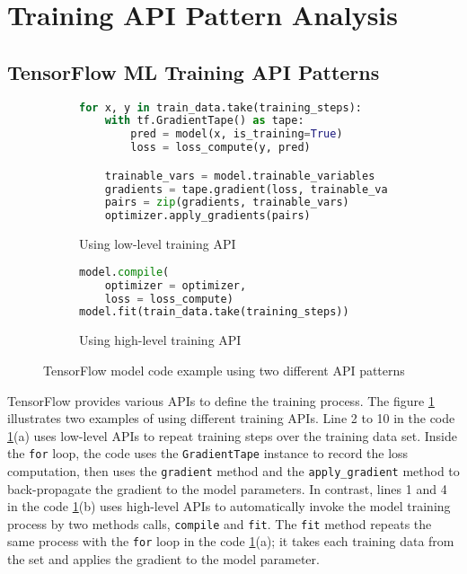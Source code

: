 \section{Training API Pattern Analysis}\label{sec:pattern}

\subsection{TensorFlow ML Training API Patterns}

\begin{figure}[ht!]
\centering
  \begin{subfigure}[b]{0.4\textwidth}
    \begin{lstlisting}[language=Python]
for x, y in train_data.take(training_steps):
    with tf.GradientTape() as tape:
        pred = model(x, is_training=True)
        loss = loss_compute(y, pred)

    trainable_vars = model.trainable_variables
    gradients = tape.gradient(loss, trainable_vars)
    pairs = zip(gradients, trainable_vars)
    optimizer.apply_gradients(pairs) 
    \end{lstlisting}
    \caption{Using low-level training API}
  \end{subfigure}
  \hspace{5mm}
  \begin{subfigure}[b]{0.45\textwidth}
    \begin{lstlisting}[language=Python]
model.compile(
    optimizer = optimizer, 
    loss = loss_compute) 
model.fit(train_data.take(training_steps))
    \end{lstlisting} 
    \caption{Using high-level training API}
  \end{subfigure}

  \caption{TensorFlow model code example using two different API patterns}
  \label{fig:pattern:ex01}
\end{figure}

TensorFlow provides various APIs to define the training process.
The figure \ref{fig:pattern:ex01} illustrates two examples of using 
different training APIs.
Line 2 to 10 in the code \ref{fig:pattern:ex01}(a)  
uses low-level APIs to repeat training steps over the training
data set. Inside the {\tt for} loop, 
the code uses the {\tt GradientTape} instance to record the loss computation,
then uses the {\tt gradient} method and the {\tt apply\_gradient} method to
back-propagate the gradient to the model parameters.
In contrast, lines 1 and 4 in the code \ref{fig:pattern:ex01}(b)
uses high-level APIs to automatically
invoke the model training process by two methods calls, {\tt compile} and
{\tt fit}. The {\tt fit} method repeats the same process with the {\tt for}
loop in the code \ref{fig:pattern:ex01}(a); it takes each training data from the set and
applies the gradient to the model parameter.

